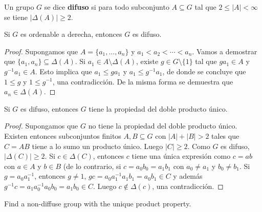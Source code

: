 \begin{definition}
	Un grupo $G$ se dice \textbf{difuso} si para todo subconjunto $A\subseteq
	G$ tal que $2\leq |A|<\infty$ se tiene $|\Delta(A)|\geq2$.
\end{definition}

\begin{lemma}
	Si $G$ es ordenable a derecha, entonces $G$ es difuso.	
\end{lemma}

\begin{proof}
	Supongamos que $A=\{a_1,\dots,a_n\}$ y $a_1<a_2<\cdots<a_n$. Vamos a
	demostrar que $\{a_1,a_n\}\subseteq\Delta(A)$. Si $a_1\in
	A\setminus\Delta(A)$, existe $g\in G\setminus\{1\}$ tal que $ga_1\in A$ y
	$g^{-1}a_1\in A$. Esto implica que $a_1\leq ga_1$ y $a_1\leq g^{-1}a_1$, de
	donde se concluye que $1\leq g$ y $1\leq g^{-1}$, una contradicción. De la
	misma forma se demuestra que $a_n\in \Delta(A)$.
\end{proof}

\begin{lemma}
	\label{lemma:difuso=>2up}
	Si $G$ es difuso, entonces $G$ tiene la propiedad del doble producto único.	
\end{lemma}

\begin{proof}
	Supongamos que $G$ no tiene la propiedad del doble producto único. Existen
	entonces subconjuntos finitos $A,B\subseteq G$ con $|A|+|B|>2$ tales que
	$C=AB$ tiene a lo sumo un producto único. Luego $|C|\geq2$. Como $G$ es
	difuso, $|\Delta(C)|\geq2$. Si $c\in\Delta(C)$, entonces $c$ tiene una
	única expresión como $c=ab$ con $a\in A$ y $b\in B$ (de lo contrario, si
	$c=a_0b_0=a_1b_1$ con $a_0\ne a_1$ y $b_0\ne b_1$. Si $g=a_0a_1^{-1}$,
	entonces $g\ne 1$, $gc=a_0a_1^{-1}a_1b_1=a_0b_1\in C$ y además
	$g^{-1}c=a_1a_0^{-1}a_0b_0=a_1b_0\in C$. Luego $c\not\in\Delta(c)$, una
	contradicción.
\end{proof}

\begin{problem}
	Find a non-diffuse group with the unique product property.
\end{problem}

